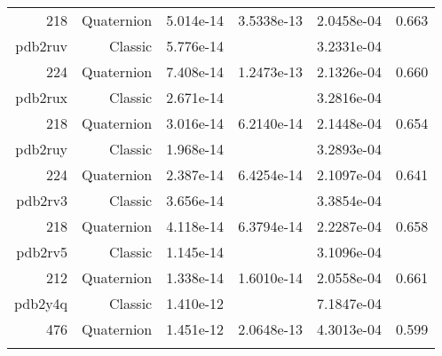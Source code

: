 \begin{xltabular}{\textwidth}{r|rS[table-format=1.3e+2]S[table-format=1.4e+2]S[table-format=1.4e+2]S[table-format=-1.3]}
218 & Quaternion & 5.014e-14 & 3.5338e-13 & 2.0458e-04 & 0.663\\  \addlinespace
{\color{red} pdb2ruv } & Classic & 5.776e-14 &  & 3.2331e-04 & \\
224 & Quaternion & 7.408e-14 & 1.2473e-13 & 2.1326e-04 & 0.660\\  \addlinespace
{\color{red} pdb2rux } & Classic & 2.671e-14 &  & 3.2816e-04 & \\
218 & Quaternion & 3.016e-14 & 6.2140e-14 & 2.1448e-04 & 0.654\\  \addlinespace
{\color{red} pdb2ruy } & Classic & 1.968e-14 &  & 3.2893e-04 & \\
224 & Quaternion & 2.387e-14 & 6.4254e-14 & 2.1097e-04 & 0.641\\  \addlinespace
{\color{red} pdb2rv3 } & Classic & 3.656e-14 &  & 3.3854e-04 & \\
218 & Quaternion & 4.118e-14 & 6.3794e-14 & 2.2287e-04 & 0.658\\  \addlinespace
{\color{red} pdb2rv5 } & Classic & 1.145e-14 &  & 3.1096e-04 & \\
212 & Quaternion & 1.338e-14 & 1.6010e-14 & 2.0558e-04 & 0.661\\  \addlinespace
{\color{red} pdb2y4q } & Classic & 1.410e-12 &  & 7.1847e-04 & \\
476 & Quaternion & 1.451e-12 & 2.0648e-13 & 4.3013e-04 & 0.599\\  \addlinespace
\end{xltabular}
